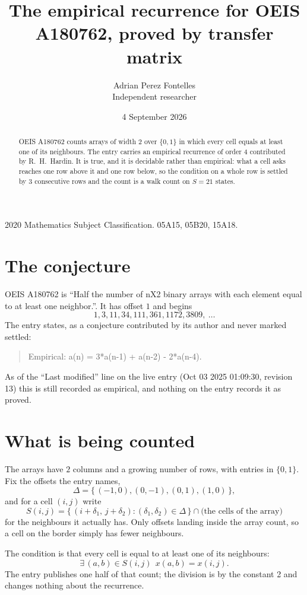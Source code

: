 \documentclass[11pt,a4paper]{article}
\title{The empirical recurrence for OEIS A180762, proved by transfer matrix}
\author{Adrian Perez Fontelles\\ \small Independent researcher}
\date{4 September 2026}
\theoremstyle{plain}
\theoremstyle{definition}
\begin{document}
\maketitle

\begin{abstract}
OEIS A180762 counts arrays of width $2$ over $\{0,1\}$ in which every cell equals at least one of its neighbours. The entry carries an
empirical recurrence of order $4$ contributed by R.~H.~Hardin. It is true, and it is
decidable rather than empirical: what a cell asks reaches one row above it and one row below, so the
condition on a whole row is settled by $3$ consecutive rows and the count is a walk
count on $S=21$ states.
\end{abstract}

\noindent\small 2020 Mathematics Subject Classification. 05A15, 05B20, 15A18.\normalsize

\section{The conjecture}

OEIS A180762 is ``Half the number of nX2 binary arrays with each element equal to at least one neighbor.''. It has offset $1$ and begins
\[
1, 3, 11, 34, 111, 361, 1172, 3809,\ \dots
\]
The entry states, as a conjecture contributed by its author and never marked settled:
\begin{quote}
Empirical: a(n) = 3*a(n-1) + a(n-2) - 2*a(n-4).
\end{quote}
As of the ``Last modified'' line on the live entry (Oct 03 2025 01:09:30, revision 13) this is still
recorded as empirical, and nothing on the entry records it as proved.

\section{What is being counted}

The arrays have $2$ columns and a growing number of rows, with entries in $\{0,1\}$. Fix the
offsets the entry names,
\[
\Delta=\{\,(-1,0), (0,-1), (0,1), (1,0)\,\},
\]
and for a cell $(i,j)$ write
\[
S(i,j)=\{\,(i+\delta_1,\,j+\delta_2) : (\delta_1,\delta_2)\in\Delta\,\}\cap
\text{(the cells of the array)}
\]
for the neighbours it actually has. Only offsets landing inside the array count, so a cell on
the border simply has fewer neighbours.

The condition is that every cell is equal to at least one of its neighbours:
\[
\exists\,(a,b)\in S(i,j)\ \ x(a,b)=x(i,j).
\]
 The entry publishes one half of that count; the division is by the constant 2 and changes nothing about the recurrence.
\end{document}
